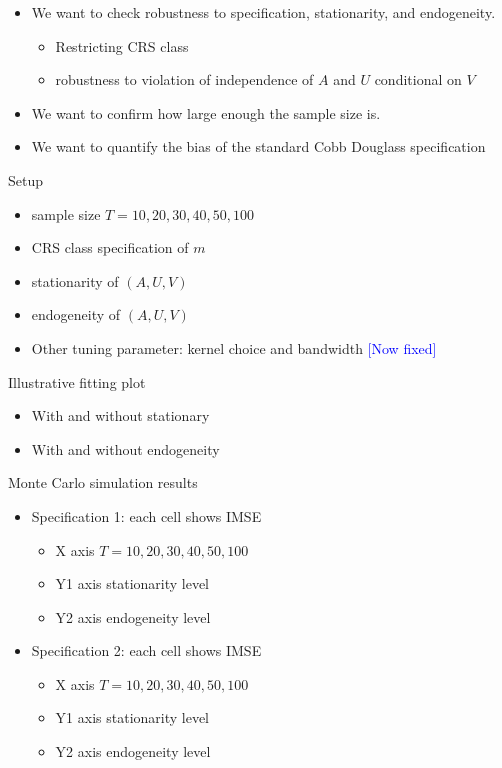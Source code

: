 \documentclass[12pt]{article}
\begin{document}
\begin{itemize}
    \item We want to check robustness to specification, stationarity, and endogeneity.
    \begin{itemize}
        \item Restricting CRS class
        \item robustness to violation of independence of $A$ and $U$ conditional on $V$
    \end{itemize}
    \item We want to confirm how large enough the sample size is.
    \item We want to quantify the bias of the standard Cobb Douglass specification 
\end{itemize}
\begin{frame}{Setup}
    \begin{itemize}
    \item sample size $T=10,20,30,40,50,100$
    \item CRS class specification of $m$
    \item stationarity of $(A,U,V)$
    \item endogeneity of $(A,U,V)$
    \item Other tuning parameter: kernel choice and bandwidth  \textcolor{blue}{[Now fixed]}
\end{itemize}
\end{frame}

\begin{frame}{Illustrative fitting plot}
\begin{itemize}
    \item With and without stationary
    \item With and without endogeneity
\end{itemize}
    
\end{frame}

\begin{frame}{Monte Carlo simulation results}
\begin{itemize}
    \item Specification 1: each cell shows IMSE
    \begin{itemize}
        \item X axis $T=10,20,30,40,50,100$ 
        \item Y1 axis stationarity level
        \item Y2 axis endogeneity level
    \end{itemize}
    \item Specification 2: each cell shows IMSE
    \begin{itemize}
        \item X axis $T=10,20,30,40,50,100$ 
        \item Y1 axis stationarity level
        \item Y2 axis endogeneity level
    \end{itemize}
    
\end{itemize}
    
\end{frame}
\end{document}
